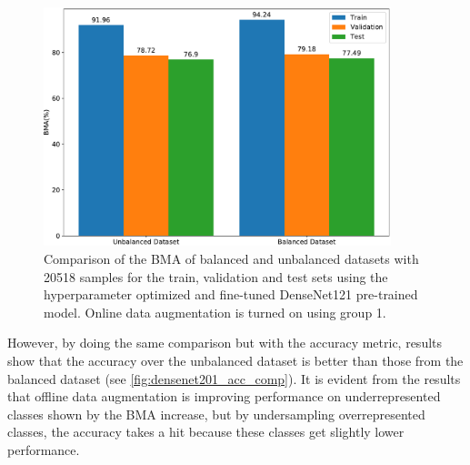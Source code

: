     \begin{figure}[ht]
        \centering
        \includegraphics[width=0.9\textwidth]{figs/densenet201_bma_comp.pdf}
        \caption[Comparison of the \ac{BMA} of balanced and unbalanced datasets with 20518 samples for the train, validation and test sets using the hyperparameter optimized and fine-tuned DenseNet121 pre-trained model.]{Comparison of the \ac{BMA} of balanced and unbalanced datasets with 20518 samples for the train, validation and test sets using the hyperparameter optimized and fine-tuned DenseNet121 pre-trained model. Online data augmentation is turned on using group 1.}
        \label{fig:densenet201_bma_comp}
    \end{figure}
    
    However, by doing the same comparison but with the accuracy metric, results show that the accuracy over the unbalanced dataset is better than those from the balanced dataset (see \autoref{fig:densenet201_acc_comp}). It is evident from the results that offline data augmentation is improving performance on underrepresented classes shown by the \ac{BMA} increase, but by undersampling overrepresented classes, the accuracy takes a hit because these classes get slightly lower performance. \par
    
